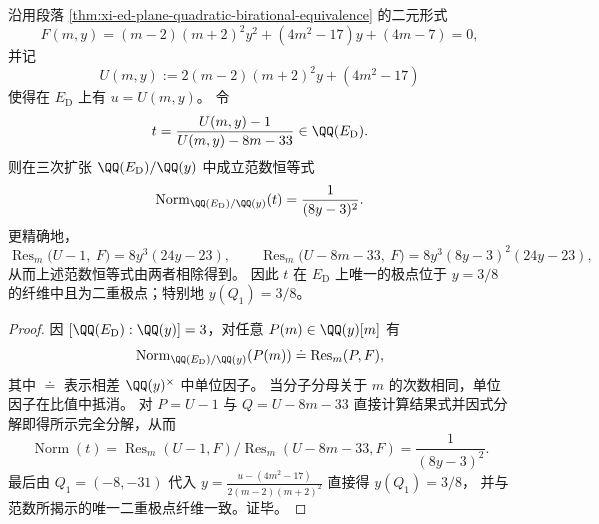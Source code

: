 \begin{theorem}\label{thm:xi-ed-norm-t-closed-form-resultant-factorization}
沿用段落 \ref{thm:xi-ed-plane-quadratic-birational-equivalence} 的二元形式
\[
F(m,y)=(m-2)(m+2)^2y^2+(4m^2-17)y+(4m-7)=0,
\]
并记
\[
U(m,y):=2(m-2)(m+2)^2y+(4m^2-17)
\]
使得在 \(E_{\mathrm D}\) 上有 \(u=U(m,y)\)。
令
\[
t=\frac{U(m,y)-1}{U(m,y)-8m-33}\in\QQ(E_{\mathrm D}).
\]
则在三次扩张 \(\QQ(E_{\mathrm D})/\QQ(y)\) 中成立范数恒等式
\[
\operatorname{Norm}_{\QQ(E_{\mathrm D})/\QQ(y)}(t)=\frac{1}{(8y-3)^2}.
\]
更精确地，
\[
\operatorname{Res}_m\bigl(U-1,\ F\bigr)=8y^3(24y-23),\qquad
\operatorname{Res}_m\bigl(U-8m-33,\ F\bigr)=8y^3(8y-3)^2(24y-23),
\]
从而上述范数恒等式由两者相除得到。
因此 \(t\) 在 \(E_{\mathrm D}\) 上唯一的极点位于 \(y=3/8\) 的纤维中且为二重极点；特别地 \(y(Q_1)=3/8\)。
\end{theorem}
\begin{proof}
因 \([\QQ(E_{\mathrm D}):\QQ(y)]=3\)，对任意 \(P(m)\in\QQ(y)[m]\) 有
\[
\operatorname{Norm}_{\QQ(E_{\mathrm D})/\QQ(y)}(P(m))\doteq \operatorname{Res}_m(P,F),
\]
其中 \(\doteq\) 表示相差 \(\QQ(y)^\times\) 中单位因子。
当分子分母关于 \(m\) 的次数相同，单位因子在比值中抵消。
对 \(P=U-1\) 与 \(Q=U-8m-33\) 直接计算结果式并因式分解即得所示完全分解，从而
\[
\operatorname{Norm}(t)=\operatorname{Res}_m(U-1,F)\Big/\operatorname{Res}_m(U-8m-33,F)=\frac{1}{(8y-3)^2}.
\]
最后由 \(Q_1=(-8,-31)\) 代入 \(y=\frac{u-(4m^2-17)}{2(m-2)(m+2)^2}\) 直接得 \(y(Q_1)=3/8\)，
并与范数所揭示的唯一二重极点纤维一致。证毕。
\end{proof}

